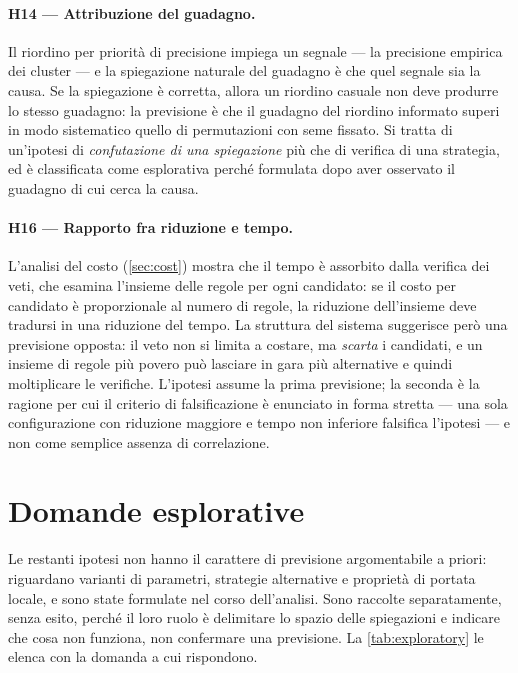 \paragraph{H14 --- Attribuzione del guadagno.} Il riordino per priorità di precisione impiega un
segnale --- la precisione empirica dei cluster --- e la spiegazione naturale del guadagno è che
quel segnale sia la causa. Se la spiegazione è corretta, allora un riordino casuale non deve
produrre lo stesso guadagno: la previsione è che il guadagno del riordino informato superi in modo
sistematico quello di permutazioni con seme fissato. Si tratta di un'ipotesi di \emph{confutazione
di una spiegazione} più che di verifica di una strategia, ed è classificata come esplorativa
perché formulata dopo aver osservato il guadagno di cui cerca la causa.

\paragraph{H16 --- Rapporto fra riduzione e tempo.} L'analisi del costo
(\autoref{sec:cost}) mostra che il tempo è assorbito dalla verifica dei veti, che esamina
l'insieme delle regole per ogni candidato: se il costo per candidato è proporzionale al numero di
regole, la riduzione dell'insieme deve tradursi in una riduzione del tempo. La struttura del
sistema suggerisce però una previsione opposta: il veto non si limita a costare, ma \emph{scarta}
i candidati, e un insieme di regole più povero può lasciare in gara più alternative e quindi
moltiplicare le verifiche. L'ipotesi assume la prima previsione; la seconda è la ragione per cui
il criterio di falsificazione è enunciato in forma stretta --- una sola configurazione con
riduzione maggiore e tempo non inferiore falsifica l'ipotesi --- e non come semplice assenza di
correlazione.

\section{Domande esplorative}\label{sec:exploratory}

Le restanti ipotesi non hanno il carattere di previsione argomentabile a priori: riguardano
varianti di parametri, strategie alternative e proprietà di portata locale, e sono state
formulate nel corso dell'analisi. Sono raccolte separatamente, senza esito, perché il loro ruolo è
delimitare lo spazio delle spiegazioni e indicare che cosa non funziona, non confermare una
previsione. La \autoref{tab:exploratory} le elenca con la domanda a cui rispondono.

